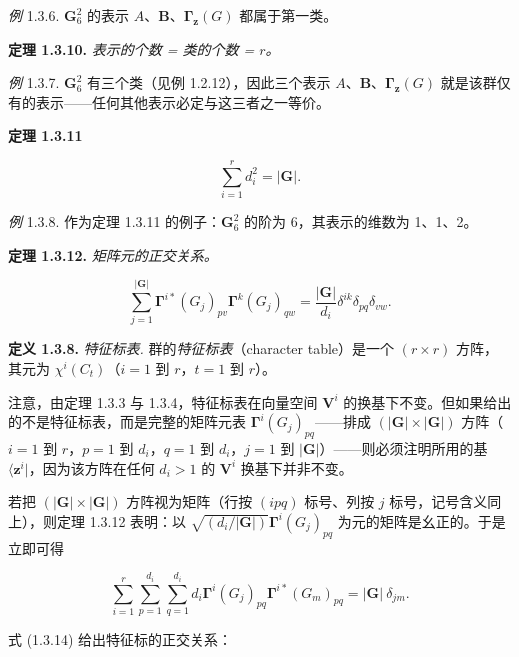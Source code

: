 \textit{例} 1.3.6. $\mathbf{G}_6^2$ 的表示 $A$、$\mathbf{B}$、$\mathbf{\Gamma}_{\mathbf{z}}(G)$ 都属于第一类。

\textbf{定理 1.3.10.} \textit{表示的个数 = 类的个数 = $r$。}

\textit{例} 1.3.7. $\mathbf{G}_6^2$ 有三个类（见例 1.2.12），因此三个表示 $A$、$\mathbf{B}$、$\mathbf{\Gamma}_{\mathbf{z}}(G)$ 就是该群仅有的表示——任何其他表示必定与这三者之一等价。

\textbf{定理 1.3.11}

\begin{equation*}
\sum_{i=1}^{r} d_{i}^{2} = |\mathbf{G}|.
\tag{1.3.13}
\end{equation*}

\textit{例} 1.3.8. 作为定理 1.3.11 的例子：$\mathbf{G}_6^2$ 的阶为 6，其表示的维数为 1、1、2。

\textbf{定理 1.3.12.} \textit{矩阵元的正交关系。}

\begin{equation*}
\sum_{j=1}^{|\mathbf{G}|} \mathbf{\Gamma}^{i*}(G_{j})_{pv}\mathbf{\Gamma}^{k}(G_{j})_{qw} = \frac{|\mathbf{G}|}{d_{i}}\delta^{ik}\delta_{pq}\delta_{vw}.
\tag{1.3.14}
\end{equation*}

\textbf{定义 1.3.8.} \textit{特征标表.} 群的\textit{特征标表}（character table）是一个 $(r \times r)$ 方阵，其元为 $\chi^{i}(C_{t})$（$i = 1$ 到 $r$，$t = 1$ 到 $r$）。

注意，由定理 1.3.3 与 1.3.4，特征标表在向量空间 $\mathbf{V}^{i}$ 的换基下不变。但如果给出的不是特征标表，而是完整的矩阵元表 $\mathbf{\Gamma}^{i}(G_{j})_{pq}$——排成 $(|\mathbf{G}| \times |\mathbf{G}|)$ 方阵（$i = 1$ 到 $r$，$p = 1$ 到 $d_{i}$，$q = 1$ 到 $d_{i}$，$j = 1$ 到 $|\mathbf{G}|$）——则必须注明所用的基 $\langle \mathbf{z}^{i}|$，因为该方阵在任何 $d_{i} > 1$ 的 $\mathbf{V}^{i}$ 换基下并非不变。

若把 $(|\mathbf{G}| \times |\mathbf{G}|)$ 方阵视为矩阵（行按 $(ipq)$ 标号、列按 $j$ 标号，记号含义同上），则定理 1.3.12 表明：以 $\sqrt{(d_{i}/|\mathbf{G}|)}\mathbf{\Gamma}^{i}(G_{j})_{pq}$ 为元的矩阵是幺正的。于是立即可得

\begin{equation*}
\sum_{i=1}^{r}\sum_{p=1}^{d_{i}}\sum_{q=1}^{d_{i}} d_{i}\mathbf{\Gamma}^{i}(G_{j})_{pq}\mathbf{\Gamma}^{i*}(G_{m})_{pq} = |\mathbf{G}|\ \delta_{jm}.
\tag{1.3.15}
\end{equation*}

式 (1.3.14) 给出特征标的正交关系：


